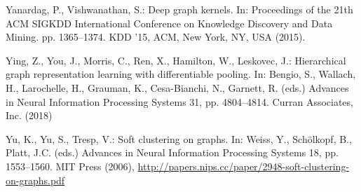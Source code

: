 \documentclass[runningheads]{llncs}
\begin{document}
\begin{thebibliography}{10}
Yanardag, P., Vishwanathan, S.: Deep graph kernels. In: Proceedings of the 21th
  ACM SIGKDD International Conference on Knowledge Discovery and Data Mining.
  pp. 1365--1374. KDD '15, ACM, New York, NY, USA (2015).

Ying, Z., You, J., Morris, C., Ren, X., Hamilton, W., Leskovec, J.:
  Hierarchical graph representation learning with differentiable pooling. In:
  Bengio, S., Wallach, H., Larochelle, H., Grauman, K., Cesa-Bianchi, N.,
  Garnett, R. (eds.) Advances in Neural Information Processing Systems 31, pp.
  4804--4814. Curran Associates, Inc. (2018)

Yu, K., Yu, S., Tresp, V.: Soft clustering on graphs. In: Weiss, Y.,
  Sch\"{o}lkopf, B., Platt, J.C. (eds.) Advances in Neural Information
  Processing Systems 18, pp. 1553--1560. MIT Press (2006),
  \url{http://papers.nips.cc/paper/2948-soft-clustering-on-graphs.pdf}

\end{thebibliography}
\end{document}
